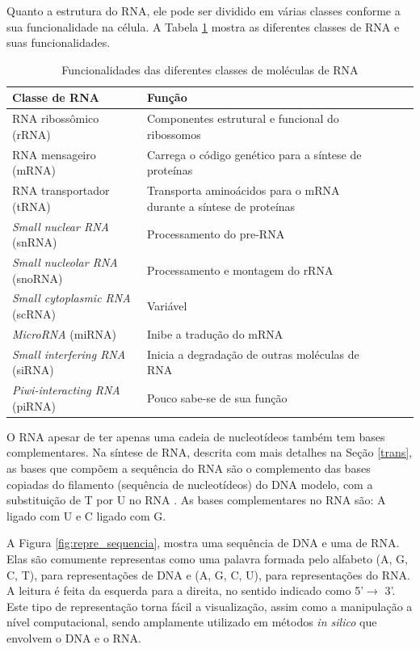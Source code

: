 Quanto a estrutura do RNA, ele pode ser dividido em várias classes conforme a sua funcionalidade na célula. A Tabela \ref{T1} mostra as diferentes classes de RNA e suas funcionalidades. 
\begin{table}
\begin{tabularx}{\textwidth}{ |X|X|X|X|X| }    \hline \label{T1}
		  	Classe de RNA      & Função          \\ \hline \hline

    RNA ribossômico (rRNA)  & Componentes estrutural e funcional do ribossomos  \\ \hline
	RNA mensageiro (mRNA)   & Carrega o código genético para a síntese de proteínas\\ \hline
    RNA transportador (tRNA)& Transporta aminoácidos para o mRNA durante a síntese de proteínas \\ \hline
	\textit{Small nuclear RNA} (snRNA)& Processamento do pre-RNA \\ \hline
	\textit{Small nucleolar RNA} (snoRNA)& Processamento e montagem do rRNA \\ \hline
	\textit{Small cytoplasmic RNA} (scRNA)& Variável\\ \hline
	\textit{MicroRNA} (miRNA)& Inibe a tradução do mRNA \\ \hline
	\textit{Small interfering RNA} (siRNA)& Inicia a degradação de outras moléculas de RNA \\ \hline
	\textit{Piwi-interacting RNA} (piRNA)& Pouco sabe-se de sua função\\ \hline					

\end{tabularx}
\caption{Funcionalidades das diferentes classes de moléculas de RNA}
\end{table}
O RNA apesar de ter apenas uma cadeia de nucleotídeos também tem bases complementares. Na síntese de RNA, descrita com mais detalhes na Seção \ref{trans}, as bases que compõem a sequência do RNA são o complemento das bases copiadas do filamento (sequência de nucleotídeos) do DNA modelo, com a substituição de T por U no RNA . As bases complementares no RNA são: A ligado com U e C ligado com G. 


A Figura \ref{fig:repre_sequencia}, mostra uma sequência de DNA e uma de RNA. Elas são comumente representas como uma palavra formada pelo alfabeto (A, G, C, T), para representações de DNA e (A, G, C, U), para representações do RNA. A leitura é feita da esquerda para a direita, no sentido indicado como 5'$\rightarrow$ 3'. Este tipo de representação torna fácil a visualização, assim como a manipulação a nível computacional, sendo amplamente utilizado em métodos \textit{in silico} que envolvem o DNA e o RNA.

